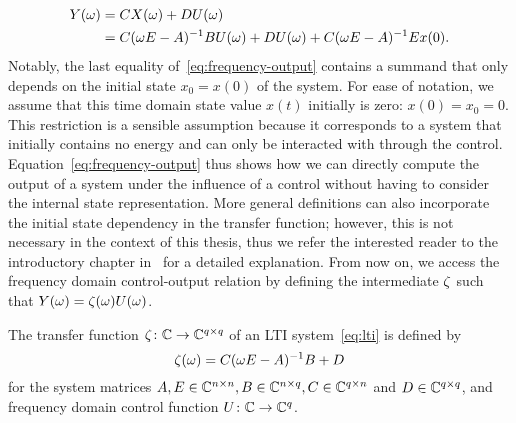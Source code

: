 \begin{equation}\label{eq:frequency-output}
    \begin{aligned}
        Y(\omega) &= C X(\omega) + D U(\omega) \\
        &= C (\omega E - A)\inv B U(\omega) + D U(\omega) + C (\omega E - A)\inv E x(0).
    \end{aligned}
\end{equation}
Notably, the last equality of~\eqref{eq:frequency-output} contains a summand that only depends on the initial state $x_0 = x(0)$ of the system.
For ease of notation, we assume that this time domain state value $x(t)$ initially is zero: $x(0) = x_0 = 0$.
This restriction is a sensible assumption because it corresponds to a system that initially contains no energy and can only be interacted with through the control.
Equation~\eqref{eq:frequency-output} thus shows how we can directly compute the output of a system under the influence of a control without having to consider the internal state representation.
More general definitions can also incorporate the initial state dependency in the transfer function; however, this is not necessary in the context of this thesis, thus we refer the interested reader to the introductory chapter in~\cite{Benner2017} for a detailed explanation.
From now on, we access the frequency domain control-output relation by defining the intermediate $\zeta$ such that $Y(\omega) = \zeta(\omega) U(\omega)$.

\begin{definition}\label{def:transfer-function}
    The transfer function $\zeta \colon \mathbb{C} \to \mathbb{C}^{q \times q}$ of an \ac{LTI} system~\eqref{eq:lti} is defined by
    \begin{equation}\label{eq:transfer-function}
        \tfunc(\omega) = C (\omega E - A)\inv B + D
    \end{equation}
    for the system matrices $A, E \in \mathbb{C}^{n \times n}, B \in \mathbb{C}^{n \times q}, C \in \mathbb{C}^{q \times n}$ and $D \in \mathbb{C}^{q \times q}$, and frequency domain control function $U \colon \mathbb{C} \to \mathbb{C}^{q}$.
\end{definition}

